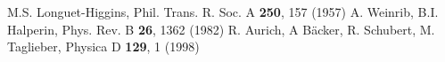 \documentclass[12pt]{article}
\begin{document}
\pagebreak

\begin{thebibliography}{99}
 M.S. Longuet-Higgins, Phil. Trans. R. Soc. A \textbf{250}, 157 (1957)
 A. Weinrib, B.I. Halperin, Phys. Rev. B \textbf{26}, 1362 (1982)
 R. Aurich, A B\"acker, R. Schubert, M. Taglieber, Physica D \textbf{129}, 1 (1998)
\end{thebibliography}
\end{document}
